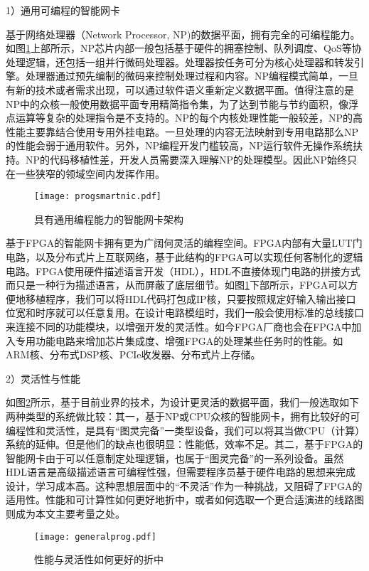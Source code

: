 1）通用可编程的智能网卡

基于网络处理器（Network Processor, NP)的数据平面，拥有完全的可编程能力。如图\ref{progsmartnic1}上部所示，NP芯片内部一般包括基于硬件的拥塞控制、队列调度、QoS等协处理逻辑，还包括一组并行微码处理器。处理器按任务可分为核心处理器和转发引擎。处理器通过预先编制的微码来控制处理过程和内容。NP编程模式简单，一旦有新的技术或者需求出现，可以通过软件语义重新定义数据平面。值得注意的是NP中的众核一般使用数据平面专用精简指令集，为了达到节能与节约面积，像浮点运算等复杂的处理指令是不支持的。NP的每个内核处理性能一般较差，NP的高性能主要靠结合使用专用外挂电路。一旦处理的内容无法映射到专用电路那么NP的性能会弱于通用软件。另外，NP编程开发门槛较高，NP运行软件无操作系统扶持。NP的代码移植性差，开发人员需要深入理解NP的处理模型。因此NP始终只在一些狭窄的领域空间内发挥作用。

\begin{figure}[!ht]
	\centering
	\texttt{[image: progsmartnic.pdf]}
	\caption{具有通用编程能力的智能网卡架构} \label{progsmartnic1}
\end{figure}

基于FPGA的智能网卡拥有更为广阔何灵活的编程空间。FPGA内部有大量LUT门电路，以及分布式片上互联网络，基于此结构的FPGA可以实现任何客制化的逻辑电路。FPGA使用硬件描述语言开发（HDL），HDL不直接体现门电路的拼接方式而只是一种行为描述语言，从而屏蔽了底层细节。如图\ref{progsmartnic1}下部所示，FPGA可以方便地移植程序，我们可以将HDL代码打包成IP核，只要按照规定好输入输出接口位宽和时序就可以任意复用。在设计电路模组时，我们一般会使用标准的总线接口来连接不同的功能模块，以增强开发的灵活性。如今FPGA厂商也会在FPGA中加入专用功能电路来增加芯片集成度、增强FPGA的处理某些任务时的性能。如ARM核、分布式DSP核、PCIe收发器、分布式片上存储。

2）灵活性与性能

如图\ref{generalprog}所示，基于目前业界的技术，为设计更灵活的数据平面，我们一般选取如下两种类型的系统做比较：其一，基于NP或CPU众核的智能网卡，拥有比较好的可编程性和灵活性，是具有“图灵完备”一类型设备，我们可以将其当做CPU（计算）系统的延伸。但是他们的缺点也很明显：性能低，效率不足。其二，基于FPGA的智能网卡由于可以任意制定处理逻辑，也属于“图灵完备”的一系列设备。虽然HDL语言是高级描述语言可编程性强，但需要程序员基于硬件电路的思想来完成设计，学习成本高。这种思想层面中的“不灵活”作为一种挑战，又阻碍了FPGA的适用性。性能和可计算性如何更好地折中，或者如何选取一个更合适演进的线路图则成为本文主要考量之处。

\begin{figure}[!ht]
	\centering
	\texttt{[image: generalprog.pdf]}
	\caption{性能与灵活性如何更好的折中} \label{generalprog}
\end{figure}




